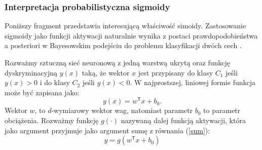 \documentclass[11pt]{book}
\theoremstyle{definition}
\begin{document}
%
\iffalse
\subsubsection{Interpretacja probabilistyczna sigmoidy}
%
Poniższy fragment przedstawia interesującą właściwość simoidy. Zastosowanie sigmoidy jako funkcji aktywacji naturalnie wynika z postaci prawdopodobieństwa a posteriori w Bayesowskim podejściu do problemu klasyfikacji dwóch cech \cite{Bishop:2006:PRML}.

Rozważmy sztuczną sieć neuronową z jedną warstwą ukrytą oraz funkcję dyskryminacyjną $y(x)$ taką, że wektor $x$ jest przypisany do klasy $C_1$ jeśli $y(x) > 0$ i do klasy $C_2$ jeśli $y(x) < 0$. W najprostszej, liniowej formie funkcja może być zapisana jako:
%
\begin{equation}
y(x) = w^\mathsf{T} x + b_0.
\label{sum}
\end{equation}
%
Wektor $w$, to $d$-wymiarowy wektor wag, natomiast parametr $b_0$ to parametr obciążenia.
%
Rozważmy funkcję $g(\cdot)$ nazywaną dalej funkcją aktywacji, która jako argument przyjmuje jako argument sumę z równania (\ref{sum}):
%
\begin{equation}
y = g\left(w^\mathsf{T} x + b_0 \right)
\label{suma}
\end{equation}
%
\def\layersep{2.5cm}
\end{document}
